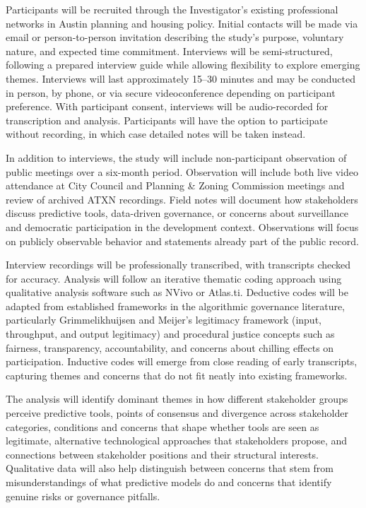 \documentclass[12pt]{article}
\begin{document}
Participants will be recruited through the Investigator's existing professional networks in Austin planning and housing policy. Initial contacts will be made via email or person-to-person invitation describing the study's purpose, voluntary nature, and expected time commitment. Interviews will be semi-structured, following a prepared interview guide while allowing flexibility to explore emerging themes. Interviews will last approximately 15--30 minutes and may be conducted in person, by phone, or via secure videoconference depending on participant preference. With participant consent, interviews will be audio-recorded for transcription and analysis. Participants will have the option to participate without recording, in which case detailed notes will be taken instead.

In addition to interviews, the study will include non-participant observation of public meetings over a six-month period. Observation will include both live video attendance at City Council and Planning \& Zoning Commission meetings and review of archived ATXN recordings. Field notes will document how stakeholders discuss predictive tools, data-driven governance, or concerns about surveillance and democratic participation in the development context. Observations will focus on publicly observable behavior and statements already part of the public record.

Interview recordings will be professionally transcribed, with transcripts checked for accuracy. Analysis will follow an iterative thematic coding approach using qualitative analysis software such as NVivo or Atlas.ti. Deductive codes will be adapted from established frameworks in the algorithmic governance literature, particularly Grimmelikhuijsen and Meijer's legitimacy framework (input, throughput, and output legitimacy) and procedural justice concepts such as fairness, transparency, accountability, and concerns about chilling effects on participation. Inductive codes will emerge from close reading of early transcripts, capturing themes and concerns that do not fit neatly into existing frameworks.

The analysis will identify dominant themes in how different stakeholder groups perceive predictive tools, points of consensus and divergence across stakeholder categories, conditions and concerns that shape whether tools are seen as legitimate, alternative technological approaches that stakeholders propose, and connections between stakeholder positions and their structural interests. Qualitative data will also help distinguish between concerns that stem from misunderstandings of what predictive models do and concerns that identify genuine risks or governance pitfalls.
\end{document}
